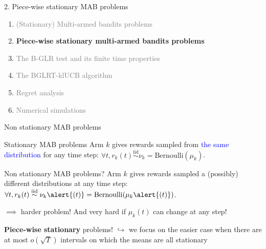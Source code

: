 \documentclass[11pt,english,ignorenonframetext,]{beamer}
\begin{document}
\begin{frame}{2. Piece-wise stationary MAB problems}

  \begin{enumerate}
    \item
    \textcolor{gray}{
      (Stationary) Multi-armed bandits problems
    }
    \vspace*{15pt}

    \item
    \alert{\textbf{%
      Piece-wise stationary multi-armed bandits problems
    }}
    \vspace*{15pt}

    \item
    \textcolor{gray}{
      The B-GLR test and its finite time properties
    }
    \vspace*{15pt}

    \item
    \textcolor{gray}{
      The BGLRT-klUCB algorithm
    }
    \vspace*{15pt}

    \item
    \textcolor{gray}{
      Regret analysis
    }
    \vspace*{15pt}

    \item
    \textcolor{gray}{
      Numerical simulations
    }
  \end{enumerate}

\end{frame}


\begin{frame}{Non stationary MAB problems}

  \begin{block}{Stationary MAB problems}
    Arm $k$ gives rewards sampled from \textcolor{blue}{the same distribution} for any time step:
    $\forall t, r_k(t) \overset{\text{iid}}{\sim} \nu_k = \mathrm{Bernoulli}(\mu_k)$.
  \end{block}

  \begin{alertblock}{Non stationary MAB problems?}
    Arm $k$ gives rewards sampled a \alert{(possibly) different distributions} at any time step:
    $\forall t, r_k(t) \overset{\text{iid}}{\sim} \nu_k\alert{(t)} = \mathrm{Bernoulli}(\mu_k\alert{(t)})$.
  \end{alertblock}

  \pause
  $\implies$ harder problem!
  And very hard if $\mu_k(t)$ can change at any step!

  \begin{block}{\textbf{Piece-wise stationary} problems!}
    $\hookrightarrow$ we focus on the easier case when there are at most $o(\sqrt{T})$ intervals on which the means are all stationary
  \end{block}
\end{frame}
\end{document}
